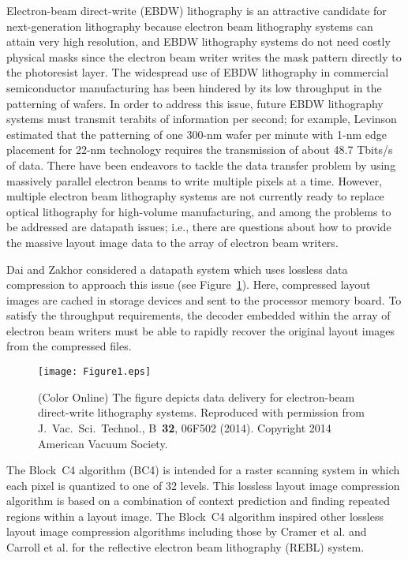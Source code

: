 \documentclass{article}
\begin{document}
Electron-beam direct-write (EBDW) lithography is an attractive candidate for
next-generation lithography because electron beam lithography systems can 
attain very high resolution, and EBDW lithography systems do not need 
costly physical masks since the electron beam writer writes the mask pattern 
directly to the photoresist layer.
The widespread use of EBDW lithography in commercial semiconductor 
manufacturing has been hindered by its low throughput in the patterning of 
wafers.  In order to address this issue, future EBDW lithography systems 
must transmit terabits of information per second;  for example, 
Levinson estimated that the patterning
of one 300-nm wafer per minute with 1-nm edge placement for 22-nm technology
requires the transmission of about 48.7 Tbits/s of data.
There have been endeavors to tackle the data transfer problem by using
massively parallel electron beams to write multiple pixels at a time.
However, multiple electron beam lithography systems are not currently ready
to replace optical lithography for high-volume manufacturing, and among the
problems to be addressed are datapath issues; i.e., there are questions
about how to provide the massive layout image data to the array of electron
beam writers. 

Dai and Zakhor considered a datapath system which uses lossless data 
compression to approach this issue (see Figure~\ref{fig:dai}).  
Here, compressed layout images are cached in storage devices and sent to the 
processor memory board.  To satisfy the throughput requirements,
the decoder embedded within the array of electron beam writers
must be able to rapidly recover the original layout images from the
compressed files. 

\begin{figure}
\centering
\texttt{[image: Figure1.eps]}
\caption{(Color Online) The figure depicts data delivery for electron-beam
direct-write lithography systems. Reproduced with permission from 
J.~Vac.~Sci.~Technol., B~{\bf 32}, 06F502 (2014). Copyright 2014 American
Vacuum Society.}
\label{fig:dai}
\end{figure}

The Block~C4 algorithm (BC4) is intended for a raster 
scanning system in which each pixel is quantized to one of 32 levels. 
This lossless layout image compression algorithm is based on a combination
of context prediction and finding repeated regions within a layout image.
The Block~C4 algorithm inspired other lossless layout image compression
algorithms including those by Cramer et al. and Carroll et al.
for the reflective electron beam lithography (REBL) system. 
\end{document}
